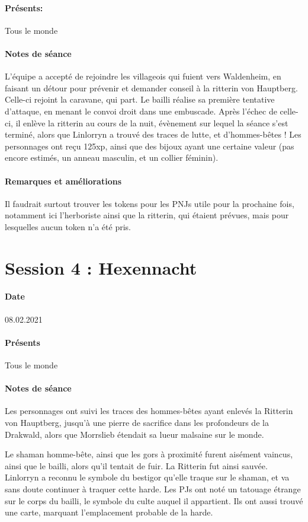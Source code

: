 \documentclass[10pt,a4paper]{book}
\begin{document}
\paragraph{Présents:}Tous le monde
\paragraph{Notes de séance} L'équipe a accepté de rejoindre les villageois qui fuient vers Waldenheim, en faisant un détour pour prévenir et demander conseil à la ritterin von Hauptberg. Celle-ci rejoint la caravane, qui part. Le bailli réalise sa première tentative d'attaque, en menant le convoi droit dans une embuscade. Après l'échec de celle-ci, il enlève la ritterin au cours de la nuit, évènement sur lequel la séance s'est terminé, alors que Linlorryn a trouvé des traces de lutte, et d'hommes-bêtes ! Les personnages ont reçu 125xp, ainsi que des bijoux ayant une certaine valeur (pas encore estimés, un anneau masculin, et un collier féminin).
\paragraph{Remarques et améliorations}
Il faudrait surtout trouver les tokens pour les PNJs utile pour la prochaine fois, notamment ici l'herboriste ainsi que la ritterin, qui étaient prévues, mais pour lesquelles aucun token n'a été pris.
\section{Session 4 : Hexennacht}
\paragraph{Date}08.02.2021
\paragraph{Présents} Tous le monde
\paragraph{Notes de séance}
Les personnages ont suivi les traces des hommes-bêtes ayant enlevés la Ritterin von Hauptberg, jusqu'à une pierre de sacrifice dans les profondeurs de la Drakwald, alors que Morrslieb étendait sa lueur malsaine sur le monde.

Le shaman homme-bête, ainsi que les gors à proximité furent aisément vaincus, ainsi que le bailli, alors qu'il tentait de fuir. La Ritterin fut ainsi sauvée. Linlorryn a reconnu le symbole du bestigor qu'elle traque sur le shaman, et va sans doute continuer à traquer cette harde. Les PJs ont noté un tatouage étrange sur le corps du bailli, le symbole du culte auquel il appartient. Ils ont aussi trouvé une carte, marquant l'emplacement probable de la harde.
\end{document}
